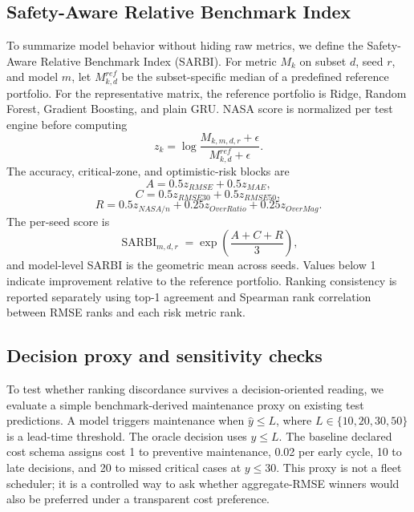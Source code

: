 \documentclass[10pt,twocolumn]{article}
\begin{document}
\subsection{Safety-Aware Relative Benchmark Index}

To summarize model behavior without hiding raw metrics, we define the Safety-Aware Relative Benchmark Index (SARBI). For metric $M_k$ on subset $d$, seed $r$, and model $m$, let $M^{ref}_{k,d}$ be the subset-specific median of a predefined reference portfolio. For the representative matrix, the reference portfolio is Ridge, Random Forest, Gradient Boosting, and plain GRU. NASA score is normalized per test engine before computing
\begin{equation}
 z_k = \log\frac{M_{k,m,d,r}+\epsilon}{M^{ref}_{k,d}+\epsilon}.
\end{equation}
The accuracy, critical-zone, and optimistic-risk blocks are
\begin{equation}
A = 0.5z_{RMSE}+0.5z_{MAE},
\end{equation}
\begin{equation}
C = 0.5z_{RMSE30}+0.5z_{RMSE50},
\end{equation}
\begin{equation}
R = 0.5z_{NASA/n}+0.25z_{OverRatio}+0.25z_{OverMag}.
\end{equation}
The per-seed score is
\begin{equation}
\operatorname{SARBI}_{m,d,r}=\exp\left(\frac{A+C+R}{3}\right),
\end{equation}
and model-level SARBI is the geometric mean across seeds. Values below 1 indicate improvement relative to the reference portfolio. Ranking consistency is reported separately using top-1 agreement and Spearman rank correlation between RMSE ranks and each risk metric rank.

\subsection{Decision proxy and sensitivity checks}

To test whether ranking discordance survives a decision-oriented reading, we evaluate a simple benchmark-derived maintenance proxy on existing test predictions. A model triggers maintenance when $\hat{y}\leq L$, where $L\in\{10,20,30,50\}$ is a lead-time threshold. The oracle decision uses $y\leq L$. The baseline declared cost schema assigns cost 1 to preventive maintenance, 0.02 per early cycle, 10 to late decisions, and 20 to missed critical cases at $y\leq30$. This proxy is not a fleet scheduler; it is a controlled way to ask whether aggregate-RMSE winners would also be preferred under a transparent cost preference.
\end{document}
